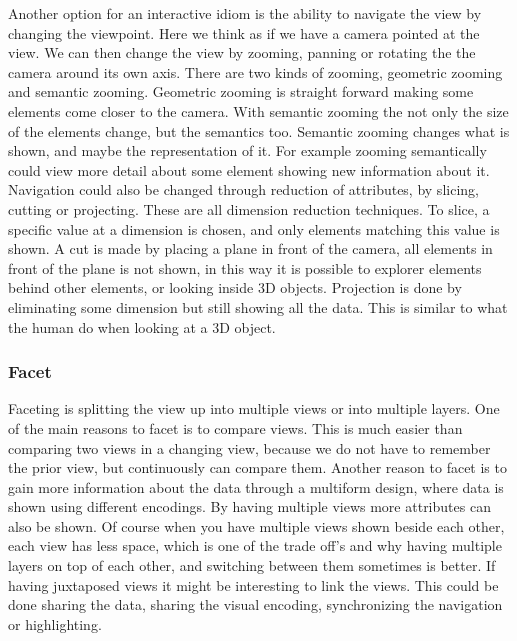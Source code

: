 \documentclass[Report.tex]{subfiles}
\begin{document}
Another option for an interactive idiom is the ability to navigate the view by changing the viewpoint. Here we think as if we have a camera pointed at the view. We can then change the view by zooming, panning or rotating the the camera around its own axis. There are two kinds of zooming, geometric zooming and semantic zooming. Geometric zooming is straight forward making some elements come closer to the camera. With semantic zooming the not only the size of the elements change, but the semantics too. Semantic zooming changes what is shown, and maybe the representation of it. For example zooming semantically could view more detail about some element showing new information about it.
Navigation could also be changed through reduction of attributes, by slicing, cutting or projecting. These are all dimension reduction techniques. To slice, a specific value at a dimension is chosen, and only elements matching this value is shown. A cut is made by placing a plane in front of the camera, all elements in front of the plane is not shown, in this way it is possible to explorer elements behind other elements, or looking inside 3D objects. Projection is done by eliminating some dimension but still showing all the data. This is similar to what the human do when looking at a 3D object.
\subsubsection{Facet}
Faceting is splitting the view up into multiple views or into multiple layers. One of the main reasons to facet is to compare views. This is much easier than comparing two views in a changing view, because we do not have to remember the prior view, but continuously can compare them. Another reason to facet is to gain more information about the data through a multiform design, where data is shown using different encodings. By having multiple views more attributes can also be shown. Of course when you have multiple views shown beside each other, each view has less space, which is one of the trade off's and why having multiple layers on top of each other, and switching between them sometimes is better. If having juxtaposed views it might be interesting to link the views.  This could be done sharing the data, sharing the visual encoding, synchronizing the navigation or highlighting. 
\end{document}
